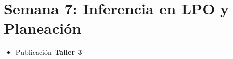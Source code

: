 \chapter{Semana 7: Inferencia en LPO y Planeación}

\begin{remark}
\begin{itemize}
    \item Publicación \textbf{Taller 3}
\end{itemize}
\end{remark}





